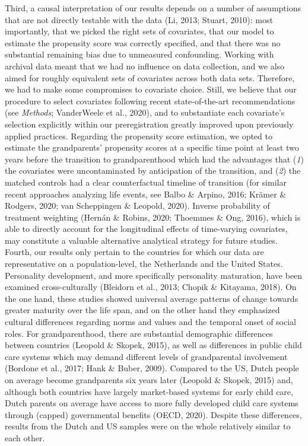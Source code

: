 \documentclass[
  english,
  man, noextraspace]{apa7}
\begin{document}
Third, a causal interpretation of our results depends on a number of assumptions that are not directly testable with the data (Li, 2013; Stuart, 2010): most importantly, that we picked the right sets of covariates, that our model to estimate the propensity score was correctly specified, and that there was no substantial remaining bias due to unmeasured confounding. Working with archival data meant that we had no influence on data collection, and we also aimed for roughly equivalent sets of covariates across both data sets. Therefore, we had to make some compromises to covariate choice. Still, we believe that our procedure to select covariates following recent state-of-the-art recommendations (see \emph{Methods}; VanderWeele et al., 2020), and to substantiate each covariate's selection explicitly within our preregistration greatly improved upon previously applied practices. Regarding the propensity score estimation, we opted to estimate the grandparents' propensity scores at a specific time point at least two years before the transition to grandparenthood which had the advantages that (\emph{1}) the covariates were uncontaminated by anticipation of the transition, and (\emph{2}) the matched controls had a clear counterfactual timeline of transition (for similar recent approaches analyzing life events, see Balbo \& Arpino, 2016; Krämer \& Rodgers, 2020; van Scheppingen \& Leopold, 2020). Inverse probability of treatment weighting (Hernán \& Robins, 2020; Thoemmes \& Ong, 2016), which is able to directly account for the longitudinal effects of time-varying covariates, may constitute a valuable alternative analytical strategy for future studies.\\
Fourth, our results only pertain to the countries for which our data are representative on a population-level, the Netherlands and the United States. Personality development, and more specifically personality maturation, have been examined cross-culturally (Bleidorn et al., 2013; Chopik \& Kitayama, 2018). On the one hand, these studies showed universal average patterns of change towards greater maturity over the life span, and on the other hand they emphasized cultural differences regarding norms and values and the temporal onset of social roles. For grandparenthood, there are substantial demographic differences between countries (Leopold \& Skopek, 2015), as well as differences in public child care systems which may demand different levels of grandparental involvement (Bordone et al., 2017; Hank \& Buber, 2009). Compared to the US, Dutch people on average become grandparents six years later (Leopold \& Skopek, 2015) and, although both countries have largely market-based systems for early child care, Dutch parents on average have access to more fully developed child care systems through (capped) governmental benefits (OECD, 2020). Despite these differences, results from the Dutch and US samples were on the whole relatively similar to each other.\\
\end{document}
